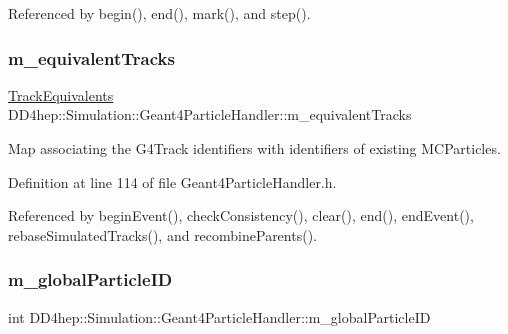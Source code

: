 Referenced by begin(), end(), mark(), and step().

\hypertarget{class_d_d4hep_1_1_simulation_1_1_geant4_particle_handler_a5978fee684baca7e2e04931783440122}{}\label{class_d_d4hep_1_1_simulation_1_1_geant4_particle_handler_a5978fee684baca7e2e04931783440122} 
\subsubsection{\texorpdfstring{m\+\_\+equivalent\+Tracks}{m\_equivalentTracks}}
{\footnotesize\ttfamily \hyperlink{class_d_d4hep_1_1_simulation_1_1_geant4_particle_handler_a6163ec58bca837bb4544fd6e2f4bc05a}{Track\+Equivalents} D\+D4hep\+::\+Simulation\+::\+Geant4\+Particle\+Handler\+::m\+\_\+equivalent\+Tracks\hspace{0.3cm}{\ttfamily [protected]}}



Map associating the G4\+Track identifiers with identifiers of existing M\+C\+Particles. 



Definition at line 114 of file Geant4\+Particle\+Handler.\+h.



Referenced by begin\+Event(), check\+Consistency(), clear(), end(), end\+Event(), rebase\+Simulated\+Tracks(), and recombine\+Parents().

\hypertarget{class_d_d4hep_1_1_simulation_1_1_geant4_particle_handler_a71f6aba6c3188b49fd16b63a3fff78a7}{}\label{class_d_d4hep_1_1_simulation_1_1_geant4_particle_handler_a71f6aba6c3188b49fd16b63a3fff78a7} 
\subsubsection{\texorpdfstring{m\+\_\+global\+Particle\+ID}{m\_globalParticleID}}
{\footnotesize\ttfamily int D\+D4hep\+::\+Simulation\+::\+Geant4\+Particle\+Handler\+::m\+\_\+global\+Particle\+ID\hspace{0.3cm}{\ttfamily [protected]}}



